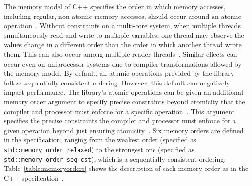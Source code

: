 The memory model of C++ specifies the order in which memory accesses, including regular, non-atomic memory accesses, should occur around an atomic operation~\cite{memoryOrderCpp2020}. Without constraints on a multi-core system, when multiple threads simultaneously read and write to multiple variables, one thread may observe the values change in a different order than the order in which another thread wrote them. This can also occur among multiple reader threads~\cite{memoryOrderCpp2020}. Similar effects can occur even on uniprocessor systems due to compiler transformations allowed by the memory model. By default, all atomic operations provided by the library follow sequentially consistent ordering. However, this default can negatively impact performance. The library's atomic operations can be given an additional memory order argument to specify precise constraints beyond atomicity that the compiler and processor must enforce for a specific operation~\cite{memoryOrderCpp2020}. This argument specifies the precise constraints the compiler and processor must enforce for a given operation beyond just ensuring atomicity~\cite{memoryOrderCpp2020}. Six memory orders are defined in the specification, ranging from the weakest order (specified as \texttt{std::memory\_order\_relaxed}) to the strongest one (specified as \texttt{std::memory\_order\_seq\_cst}), which is a sequentially-consistent ordering. Table~\ref{table:memoryorders} shows the description of each memory order as in the C++ specification~\cite{memoryOrderCpp2020}.

